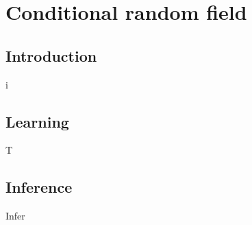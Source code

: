 
\chapter{Conditional random field}
\section{Introduction}
i
\section{Learning}
T
\section{Inference}
Infer


